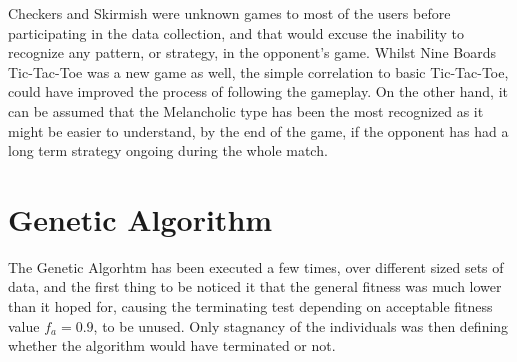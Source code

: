 Checkers and Skirmish were unknown games to most of the users before participating in the data collection, and that would excuse the inability to recognize any pattern, or strategy, in the opponent's game. Whilst Nine Boards Tic-Tac-Toe was a new game as well, the simple correlation to basic Tic-Tac-Toe, could have improved the process of following the gameplay. On the other hand, it can be assumed that the Melancholic type has been the most recognized as it might be easier to understand, by the end of the game, if the opponent has had a long term strategy ongoing during the whole match. 
\section{Genetic Algorithm}\label{sec:gares}
The Genetic Algorhtm has been executed a few times, over different sized sets of data, and the first thing to be noticed it  that the general fitness was much lower than it hoped for, causing the terminating test depending on acceptable fitness value $f_a=0.9$, to be unused. Only stagnancy of the individuals was then defining whether the algorithm would have terminated or not.\\


